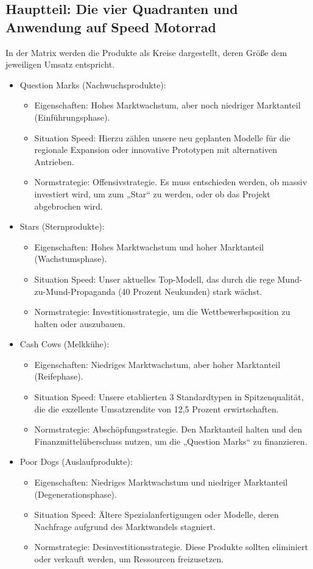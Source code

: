 \documentclass[12pt, a4paper]{article}
\begin{document}
\subsection{Hauptteil: Die vier Quadranten und Anwendung auf Speed Motorrad}
In der Matrix werden die Produkte als Kreise dargestellt, deren Größe dem jeweiligen Umsatz entspricht.
\begin{itemize}
\item Question Marks (Nachwuchsprodukte):
    \begin{itemize}
        \item Eigenschaften: Hohes Marktwachstum, aber noch niedriger Marktanteil (Einführungsphase).
        \item Situation Speed: Hierzu zählen unsere neu geplanten Modelle für die regionale Expansion oder innovative Prototypen mit alternativen Antrieben.
        \item Normstrategie: Offensivstrategie. Es muss entschieden werden, ob massiv investiert wird, um zum „Star“ zu werden, oder ob das Projekt abgebrochen wird.
    \end{itemize}
\item Stars (Sternprodukte):
    \begin{itemize}
        \item Eigenschaften: Hohes Marktwachstum und hoher Marktanteil (Wachstumsphase).
        \item Situation Speed: Unser aktuelles Top-Modell, das durch die rege Mund-zu-Mund-Propaganda (40 Prozent Neukunden) stark wächst.
        \item Normstrategie: Investitionsstrategie, um die Wettbewerbsposition zu halten oder auszubauen.
    \end{itemize}
\item Cash Cows (Melkkühe):
    \begin{itemize}
        \item Eigenschaften: Niedriges Marktwachstum, aber hoher Marktanteil (Reifephase).
        \item Situation Speed: Unsere etablierten 3 Standardtypen in Spitzenqualität, die die exzellente Umsatzrendite von 12,5 Prozent erwirtschaften.
        \item Normstrategie: Abschöpfungsstrategie. Den Marktanteil halten und den Finanzmittelüberschuss nutzen, um die „Question Marks“ zu finanzieren.
    \end{itemize}
\item Poor Dogs (Auslaufprodukte):
    \begin{itemize}
        \item Eigenschaften: Niedriges Marktwachstum und niedriger Marktanteil (Degenerationsphase).
        \item Situation Speed: Ältere Spezialanfertigungen oder Modelle, deren Nachfrage aufgrund des Marktwandels stagniert.
        \item Normstrategie: Desinvestitionsstrategie. Diese Produkte sollten eliminiert oder verkauft werden, um Ressourcen freizusetzen.
    \end{itemize}
\end{itemize}
\end{document}
